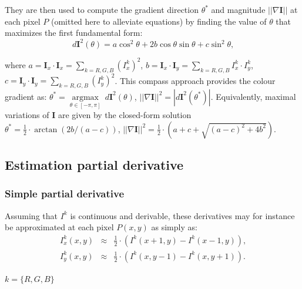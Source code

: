 \documentclass[twoside]{article}
\begin{document}
\noindent They are then used to compute the gradient direction $\theta^{*}$ and magnitude $||\nabla \mathbf{I}||$ at each pixel $P$ (omitted here to alleviate equations) by finding the value of $\theta$ that maximizes the first fundamental form:
\begin{equation}\label{eq:dI^2}
d \textbf{I}^2(\theta)= a \cos^2 \theta + 2 b\cos \theta \sin \theta + c \sin^2 \theta \text{,}
\end{equation}

\noindent where $a = \textbf{I}_x \cdot \textbf{I}_x = \sum_{k=R,G,B} (I^k_x)^2$, $b = \textbf{I}_x \cdot \textbf{I}_y = \sum_{k=R,G,B} I^k_x \cdot I^k_y$, $c = \textbf{I}_y \cdot \textbf{I}_y = \sum_{k=R,G,B} (I^k_y)^2$. This compass approach provides the colour gradient as: $\theta^{*} = \underset{\theta \in [-\pi,\pi]}{\operatorname{argmax}}~d \textbf{I}^2(\theta)$, $||\nabla \mathbf{I}||^2 = \left| d \textbf{I}^2( \theta^{*}) \right|$. Equivalently, maximal variations of $\mathbf{I}$ are given by the closed-form solution $\theta^{*} = \frac{1}{2} \cdot \arctan \left( 2b / (a-c) \right)$, $||\nabla \mathbf{I}||^2=\frac{1}{2} \cdot \left( a + c+ \sqrt{(a-c)^2+4b^2} \right)$. 


\subsection{Estimation partial derivative}
\label{Estimation partial derivative}

\subsubsection{Simple partial derivative}
\label{Simple partial derivative}
Assuming that $I^k$ is continuous and derivable, these derivatives may for instance be approximated at each pixel $P(x,y)$ as simply as:
\begin{equation}
	\begin{array}{rcl}
		I^k_x(x,y) &\approx& \frac{1}{2} \cdot \left( I^k(x+1,y) - I^k(x-1,y) \right) \text{,} \\
		I^k_y(x,y) &\approx& \frac{1}{2} \cdot \left( I^k(x,y-1) - I^k(x,y+1) \right) \text{.}
	\end{array}
\label{eq:partial_colour_derivatives}
\end{equation}

$k=\{R,G,B\}$
\end{document}
